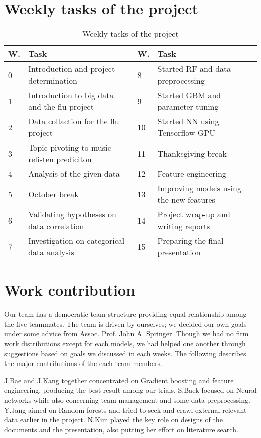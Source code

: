 \documentclass{article}
\begin{document}
\newpage
\begin{appendices}
\section{Weekly tasks of the project}

\begin{table}[!h]
\centering
\begin{tabular}{|l|l||l|l|}
\hline \rowcolor[HTML]{C0C0C0}
W. & Task & W. & Task \\\hline \rowcolor[HTML]{FFFFFF}
0 & Introduction and project determination & 8 & Started RF and data
preprocessing \\\hline
1 & Introduction to big data and the flu project & 9 & Started GBM and parameter
tuning
\\\hline
2 & Data collaction for the flu project & 10 & Started NN using
Tensorflow-GPU
\\\hline
3 & Topic pivoting to music relisten prediciton & 11 &
Thanksgiving break \\\hline
4 & Analysis of the given data & 12 & Feature engineering
\\\hline
5 & October break & 13 & Improving models using the new features
\\\hline
6 & Validating hypotheses on data correlation & 14 & Project wrap-up and
writing reports \\\hline
7 & Investigation on categorical data analysis & 15 & Preparing the
final presentation \\\hline
\end{tabular}
\caption{Weekly tasks of the project}
\label{table:weektask}
\end{table}

\section{Work contribution}
Our team has a democratic team structure providing equal relationship among the
five teammates. The team is driven by ourselves; we decided our own goals under
some advice from Assoc. Prof. John A. Springer. Though we had no firm work
distributions except for each models, we had helped one another through
suggestions based on goals we discussed in each weeks. The following describes
the major contributions of the each team members.

J.Bae and J.Kang together concentrated on Gradient boosting and
feature engineering, producing the best result among our trials. S.Baek focused
on Neural networks while also concerning team management and some data
preprocessing. Y.Jang aimed on Random forests and tried to seek and crawl
external relevant data earlier in the project. N.Kim played the key role on
designs of the documents and the presentation, also putting her effort on
literature search.


\end{appendices}
\end{document}

